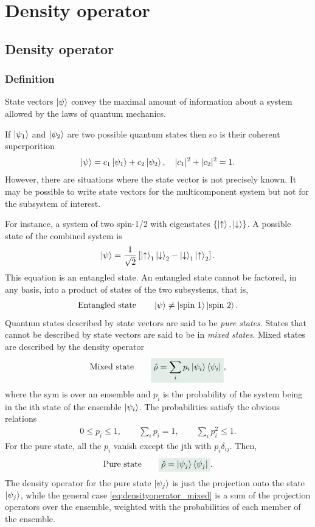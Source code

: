 \chapter{Density operator}
%
\section{Density operator}
\subsection{Definition}
State vectors $\left|\psi\right\rangle$ convey the maximal amount of information about a system allowed by the laws of quantum mechanics.

If $\left|\psi_1\right\rangle$ and $\left|\psi_2\right\rangle$ are two possible quantum states then so is their coherent superporition
\begin{align*}
    \left|\psi\right\rangle=c_1\left|\psi_1\right\rangle+c_2\left|\psi_2\right\rangle,\quad|c_1|^2+|c_2|^2=1.
\end{align*}
However, there are situations where the state vector is not precisely known.
It may be possible to write state vectors for the multicomponent system but not for the subsystem of interest.

For instance, a system of two spin-1/2 with eigenstates $\{\left|\uparrow\right\rangle,\left|\downarrow\right\rangle\}$. A possible state of the combined system is 
\begin{align*}
    \left|\psi\right\rangle=\frac{1}{\sqrt{2}}\left[\left|\uparrow\right\rangle_1\left|\downarrow\right\rangle_2-\left|\downarrow\right\rangle_1\left|\uparrow\right\rangle_2\right].
\end{align*}
This equation is an entangled state. An entangled state cannot be factored, in any basis, into a product of states of the two subsystems, that is,
\begin{align*}
    \text{Entangled state}\qquad\left|\psi\right\rangle\neq\left|\text{spin 1}\right\rangle\left|\text{spin 2}\right\rangle.
\end{align*}
Quantum states described by state vectors are said to be \emph{pure states}. States that cannot be described by state vectors are said to be in 
\emph{mixed states}. Mixed states are described by the density operator 
\begin{align}
    \text{Mixed state}\qquad\highlight{\hrho=\sum_ip_i\ket{\psi_i}\bra{\psi_i}},
    \label{eq:densityoperator_mixed}
\end{align}
where the sym is over an ensemble and $p_i$ is the probability of the system being in the ith state of the ensemble $\left|\psi_i\right\rangle$.
The probabilities satisfy the obvious relations 
\begin{align*}
    0\leq p_i\leq1,\qquad\sum_ip_i=1,\qquad\sum_ip_i^2\leq1.
\end{align*}
For the pure state, all the $p_i$ vanish except the jth with $p_i\delta_{ij}$. Then,
\begin{align*}
    \text{Pure state}\qquad\highlight{\hrho=\ket{\psi_j}\bra{\psi_j}}.
    \label{eq:densityoperator_pure}
\end{align*}
The density operator for the pure state $\left|\psi_j\right\rangle$ is just the projection onto the state $\left|\psi_j\right\rangle$, while the general case 
\eqref{eq:densityoperator_mixed} is a sum of the projection operators over the ensemble, weighted with the probabilities of each member 
of the ensemble.

